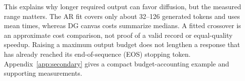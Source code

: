 This explains why longer required output can favor diffusion, but the
measured range matters. The AR fit covers only about 32--126 generated
tokens and uses mean times, whereas DG canvas costs summarize medians.
A fitted crossover is an approximate cost comparison, not proof of a
valid record or equal-quality speedup. Raising a maximum output budget
does not lengthen a response that has already reached its end-of-sequence
(EOS) stopping token. Appendix~\ref{app:secondary} gives a compact
budget-accounting example and supporting measurements.
